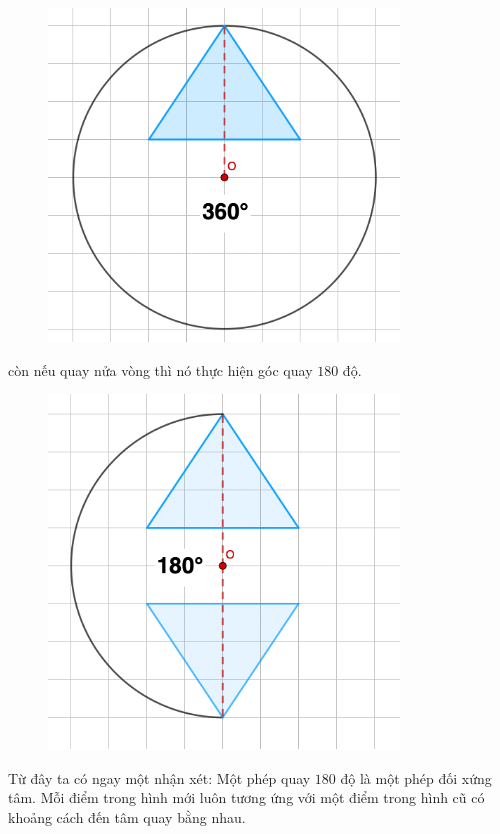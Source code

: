 \begin{multicols}{2}
	\begin{figure}[H]
		\vspace*{5pt}
		\centering
		\captionsetup{labelformat= empty, justification=centering}
		\includegraphics[width= 0.65\linewidth]{Picture20}
		\vspace*{-10pt}
	\end{figure}
	còn nếu quay nửa vòng thì nó thực hiện góc quay $180$ độ.
	\begin{figure}[H]
		\vspace*{-5pt}
		\centering
		\captionsetup{labelformat= empty, justification=centering}
		\includegraphics[width= 0.65\linewidth]{Picture21}
		\vspace*{-10pt}
	\end{figure}
	Từ đây ta có ngay một nhận xét: Một phép quay $180$ độ là một phép đối xứng tâm. Mỗi điểm trong hình mới luôn tương ứng với một điểm trong hình cũ có khoảng cách đến tâm quay bằng nhau.
	\begin{figure}[H]

\end{figure}
\end{multicols}
